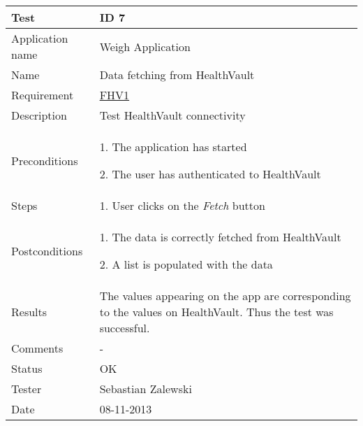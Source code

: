 \begin{table}
\begin{center}
\begin{tabular}{ | l | p{10cm} | }
	\hline
	\textbf{Test}	&	\textbf{ID 7} \\
	\hline\noalign{\smallskip}\noalign{\smallskip}\hline
	Application name	& Weigh Application \\
	Name				& Data fetching from HealthVault\\
	Requirement			& \hyperref[table:reqweight]{FHV1} \\
	Description			& Test HealthVault connectivity \\
	Preconditions		&	\par 1. The application has started
							\par 2. The user has authenticated to HealthVault \\
	Steps 				&	\par 1. User clicks on the \textit{Fetch} button \\
	Postconditions		&	\par 1. The data is correctly fetched from HealthVault
							\par 2. A list is populated with the data \\
	Results				& The values appearing on the app are corresponding to the values on HealthVault.
						  Thus the test was successful. \\
	Comments			& - \\
	Status				& OK \\
	Tester				& Sebastian Zalewski \\
	Date				& 08-11-2013 \\
	\hline
\end{tabular}
\end{center}
\end{table}

